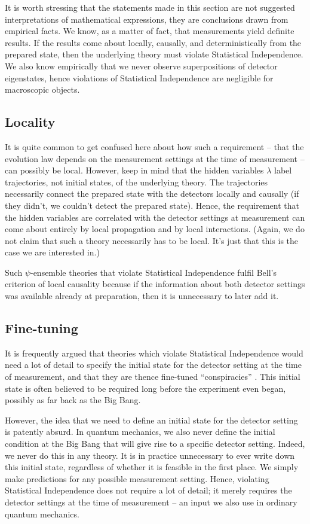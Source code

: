 \documentclass[superscriptaddress,twocolumn,floatfix,nofootinbib]{revtex4-2}
\begin{document}
It is worth stressing that the statements made in this section are not suggested interpretations of mathematical expressions, they are conclusions drawn from empirical facts. We know, as a matter of fact, that measurements yield definite results. If the results come about locally, causally, and deterministically from the prepared state, then the underlying theory must violate Statistical Independence. We also know empirically that we never observe superpositions of detector eigenstates, hence violations of Statistical Independence are negligible for macroscopic objects. 

\subsection{Locality}


It is quite common to get confused here about how such a requirement -- that the evolution law depends on the measurement settings at the time of measurement -- can possibly be local. However, keep in mind that the hidden variables $\lambda$ label trajectories, not initial states, of the underlying theory. The trajectories necessarily connect the prepared state with the detectors locally and causally (if they didn't, we couldn't detect the prepared state). Hence, the requirement that the hidden variables are correlated with the detector settings at measurement can come about entirely by local propagation and by local interactions. (Again, we do not claim that such a theory necessarily has to be local. It's just that this is the case we are interested in.)

Such $\psi$-ensemble theories that violate Statistical Independence fulfil Bell's criterion of local causality because if the information about both detector settings was available already at preparation, then it is unnecessary to later add it. 

\subsection{Fine-tuning}

It is frequently argued that theories which violate Statistical Independence would need a lot of detail to specify the initial state for the detector setting at the time of measurement, and that they are thence fine-tuned ``conspiracies'' \cite{Sen2020Superdet2}. This initial state is often believed to be required long before the experiment even began, possibly as far back as the Big Bang. 

However, the idea that we need to define an initial state for the detector setting is patently absurd. In quantum mechanics, we also never define the initial condition at the Big Bang that will give rise to a specific detector setting. Indeed, we never do this in any theory. It is in practice unnecessary to ever write down this initial state, regardless of whether it is feasible in the first place. We simply make predictions for any possible measurement setting. Hence, violating Statistical Independence does not require a lot of detail; it merely requires the detector settings at the time of measurement -- an input we also use in ordinary quantum mechanics.
\end{document}
